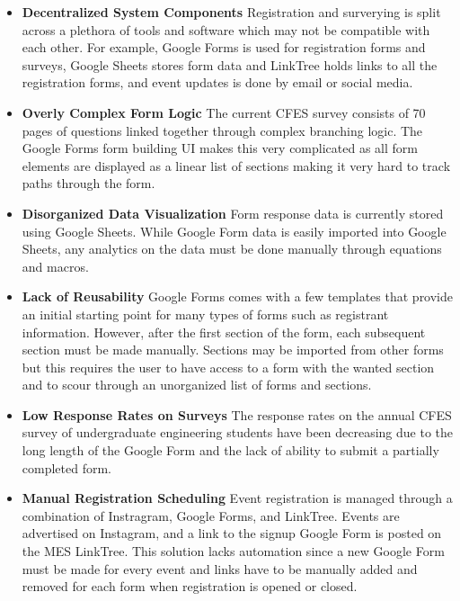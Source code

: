 \documentclass[12pt]{article}
\begin{document}
\begin{itemize}
  \item \textbf{Decentralized System Components} Registration and surverying is split across a plethora of tools and software which may not be compatible with each other. For example, Google Forms is used for registration forms and surveys, Google Sheets stores form data and LinkTree holds links to all the registration forms, and event updates is done by email or social media. 
  \item \textbf{Overly Complex Form Logic} The current CFES survey consists of 70 pages of questions linked together through complex branching logic. The Google Forms form building UI makes this very complicated as all form elements are displayed as a linear list of sections making it very hard to track paths through the form.
  \item \textbf{Disorganized Data Visualization} Form response data is currently stored using Google Sheets. While Google Form data is easily imported into Google Sheets, any analytics on the data must be done manually through equations and macros.
  \item \textbf{Lack of Reusability} Google Forms comes with a few templates that provide an initial starting point for many types of forms such as registrant information. However, after the first section of the form, each subsequent section must be made manually. Sections may be imported from other forms but this requires the user to have access to a form with the wanted section and to scour through an unorganized list of forms and sections.
  \item \textbf{Low Response Rates on Surveys} The response rates on the annual CFES survey of undergraduate engineering students have been decreasing due to the long length of the Google Form and the lack of ability to submit a partially completed form.
  \item \textbf{Manual Registration Scheduling} Event registration is managed through a combination of Instragram, Google Forms, and LinkTree. Events are advertised on Instagram, and a link to the signup Google Form is posted on the MES LinkTree. This solution lacks automation since a new Google Form must be made for every event and links have to be manually added and removed for each form when registration is opened or closed. 
\end{itemize}
% 
\end{document}
